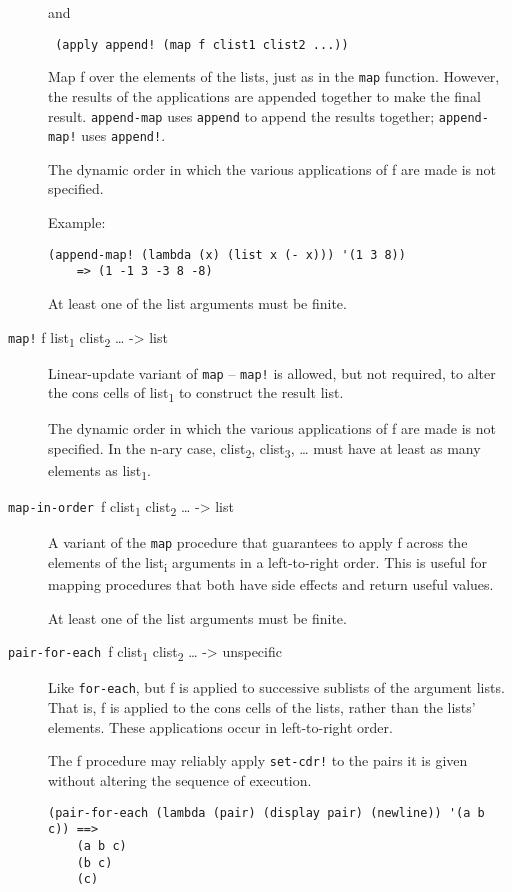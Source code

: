 \begin{description}
and

\texttt{\ (apply\ append!\ (map\ f\ clist1\ clist2\ ...))}

Map f over the elements of the lists, just as in the \texttt{map}
function. However, the results of the applications are appended together
to make the final result. \texttt{append-map} uses \texttt{append} to
append the results together; \texttt{append-map!} uses \texttt{append!}.

The dynamic order in which the various applications of f are made is not
specified.

Example:

\begin{verbatim}
(append-map! (lambda (x) (list x (- x))) '(1 3 8))
    => (1 -1 3 -3 8 -8)
\end{verbatim}

At least one of the list arguments must be finite.
\item[ \href{}{} \texttt{map!} f list\textsubscript{1}
clist\textsubscript{2} \ldots{} -\textgreater{} list ]
Linear-update variant of \texttt{map} -- \texttt{map!} is allowed, but
not required, to alter the cons cells of list\textsubscript{1} to
construct the result list.

The dynamic order in which the various applications of f are made is not
specified. In the n-ary case, clist\textsubscript{2},
clist\textsubscript{3}, \ldots{} must have at least as many elements as
list\textsubscript{1}.
\item[ \href{}{} \texttt{map-in-order\ }f clist\textsubscript{1}
clist\textsubscript{2} \ldots{} -\textgreater{} list ]
A variant of the \texttt{map} procedure that guarantees to apply f
across the elements of the list\textsubscript{i} arguments in a
left-to-right order. This is useful for mapping procedures that both
have side effects and return useful values.

At least one of the list arguments must be finite.
\item[ \href{}{} \texttt{pair-for-each\ }f clist\textsubscript{1}
clist\textsubscript{2} \ldots{} -\textgreater{} unspecific ]
Like \texttt{for-each}, but f is applied to successive sublists of the
argument lists. That is, f is applied to the cons cells of the lists,
rather than the lists' elements. These applications occur in
left-to-right order.

The f procedure may reliably apply \texttt{set-cdr!} to the pairs it is
given without altering the sequence of execution.

\begin{verbatim}
(pair-for-each (lambda (pair) (display pair) (newline)) '(a b c)) ==>
    (a b c)
    (b c)
    (c)
\end{verbatim}


\end{description}
